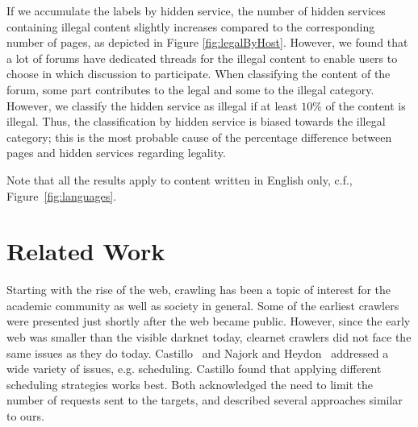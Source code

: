 If we accumulate the labels by hidden service, the number of hidden services containing illegal content slightly increases compared to the corresponding number of pages, as depicted in Figure \ref{fig:legalByHost}.
However, we found that a lot of forums have dedicated threads for the illegal content to enable users to choose in which discussion to participate. When classifying the content of the forum, some part contributes to the legal and some to the illegal category. However, we classify the hidden service as illegal if at least $10\%$ of the content is illegal. Thus, the classification by hidden service is biased towards the illegal category; this is the most probable cause of the percentage difference between pages and hidden services regarding legality.


Note that all the results apply to content written in English only, c.f., Figure~\ref{fig:languages}.


\section{Related Work}\label{sec:relatedwork}

Starting with the rise of the web, crawling has been a topic of interest  for the academic community as well as society in general. Some of the earliest crawlers \cite{Gray1993,McBryan1994,Eichmann1994,Pinkerton1994} were presented just shortly after the web became public. However, since the early web was smaller than the visible darknet today, clearnet crawlers did not face the same issues as they do today. Castillo~\cite{Castillo2005} and Najork and Heydon~\cite{Najork2002} addressed a wide variety of issues, e.g. scheduling. Castillo found that applying different scheduling strategies works best. Both acknowledged the need to limit the number of requests sent to the targets, and described several approaches similar to ours.

